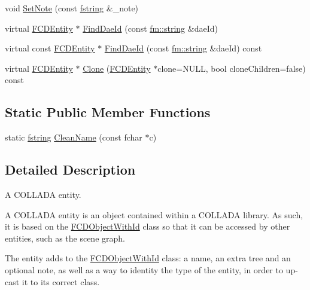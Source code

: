 \begin{DoxyCompactItemize}
void \hyperlink{classFCDEntity_a8589906fc686e63486db9bc8e899f794}{SetNote} (const \hyperlink{classfm_1_1stringT}{fstring} \&\_\-note)
\item 
virtual \hyperlink{classFCDEntity}{FCDEntity} $\ast$ \hyperlink{classFCDEntity_a308cd3366b76e70ded4f09d05e4d7294}{FindDaeId} (const \hyperlink{classfm_1_1stringT}{fm::string} \&daeId)
\item 
virtual const \hyperlink{classFCDEntity}{FCDEntity} $\ast$ \hyperlink{classFCDEntity_a1a17dca81798431f54ec10f5da5c5c6b}{FindDaeId} (const \hyperlink{classfm_1_1stringT}{fm::string} \&daeId) const 
\item 
virtual \hyperlink{classFCDEntity}{FCDEntity} $\ast$ \hyperlink{classFCDEntity_afd21dc9f9dba45786012dea87f70b9fc}{Clone} (\hyperlink{classFCDEntity}{FCDEntity} $\ast$clone=NULL, bool cloneChildren=false) const 
\end{DoxyCompactItemize}
\subsection*{Static Public Member Functions}
\begin{DoxyCompactItemize}
\item 
static \hyperlink{classfm_1_1stringT}{fstring} \hyperlink{classFCDEntity_ac3e33404794eafcba3279ae4e8414da0}{CleanName} (const fchar $\ast$c)
\end{DoxyCompactItemize}


\subsection{Detailed Description}
A COLLADA entity.

A COLLADA entity is an object contained within a COLLADA library. As such, it is based on the \hyperlink{classFCDObjectWithId}{FCDObjectWithId} class so that it can be accessed by other entities, such as the scene graph.

The entity adds to the \hyperlink{classFCDObjectWithId}{FCDObjectWithId} class: a name, an extra tree and an optional note, as well as a way to identity the type of the entity, in order to up-\/cast it to its correct class. 

